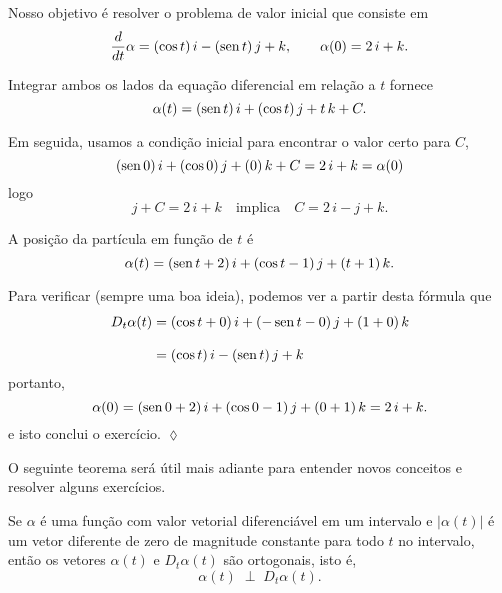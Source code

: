 \solo
Nosso objetivo é resolver o problema de valor inicial que consiste em
\begin{equation*}
\frac{d}{dt}\alpha =(\cos t)\, i-(\operatorname{sen} t)\, j + k, \qquad \alpha(0)= 2\,i+k.
\end{equation*}

Integrar ambos os lados da equação diferencial em relação a $t$ fornece
\begin{equation*}
\alpha(t) = (\operatorname{sen} t)\,i+ (\cos t)\,j +t\,k+ C.
\end{equation*}

Em seguida, usamos a condição inicial para encontrar o valor certo para $C$,
\begin{equation*}
(\operatorname{sen} 0)\,i + (\cos 0)\,j + (0)\, k + C = 2\,i + k = \alpha(0)
\end{equation*}
logo
\begin{equation*}
j+C=2\,i+k \quad \text{implica}\quad C=2\,i-j+k.
\end{equation*}

A posição da partícula em função de $t$ é
\begin{equation*}
\alpha(t) = (\operatorname{sen} t+2)\, i + (\cos t-1)\, j + (t+1)\, k.
\end{equation*}

Para verificar (sempre uma boa ideia), podemos ver a partir desta fórmula que
\begin{align*}
D_{t}\alpha(t) &= (\cos t + 0)\, i + (- \operatorname{sen} t - 0)\, j + (1 + 0)\, k\\[2ex]
&= (\cos t)\, i-(\operatorname{sen} t)\, j + k
\end{align*}
portanto,
\begin{equation*}
\alpha(0) = (\operatorname{sen} 0 + 2)\, i + (\cos 0 - 1)\, j + (0 + 1)\, k = 2\, i + k.
\end{equation*}
e isto conclui o exercício. \hfill $\lozenge$

O seguinte teorema será útil mais adiante para entender novos conceitos e resolver alguns exercícios.

\begin{teo} \label{thm:14-4-11}
Se \(\alpha\) é uma função com valor vetorial diferenciável em um intervalo e \(|\alpha(t)|\) é um vetor diferente de
zero de magnitude constante  para todo \(t\) no intervalo, então os vetores \(\alpha(t)\) e \(D_{t}\alpha(t)\) são
ortogonais, isto é,
\begin{equation*}
  \alpha(t)\; \perp\; D_{t}\alpha(t).
\end{equation*}
\end{teo}

